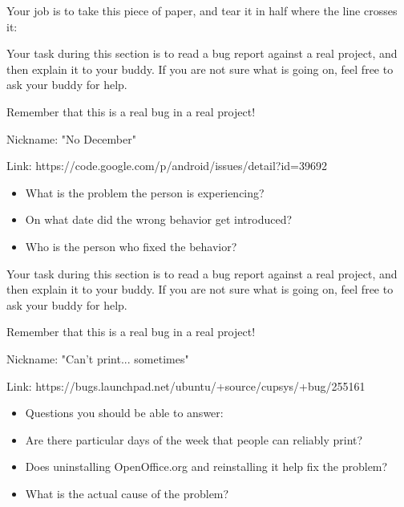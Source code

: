 \documentclass{article}
\begin{document}
Your job is to take this piece of paper, and tear it in half
where the line crosses it:

\hrulefill

Your task during this section is to read a bug report against a real project, and 
then explain it to your buddy. If you are not sure what is going on, feel free to 
ask your buddy for help.

Remember that this is a real bug in a real project!

Nickname: "No December"

Link: https://code.google.com/p/android/issues/detail?id=39692

\begin{itemize}
\item What is the problem the person is experiencing?
\item On what date did the wrong behavior get introduced?
\item Who is the person who fixed the behavior?
\end{itemize}

\hrulefill



Your task during this section is to read a bug report against a real project, and 
then explain it to your buddy. If you are not sure what is going on, feel free to 
ask your buddy for help.

Remember that this is a real bug in a real project!

Nickname: "Can't print... sometimes"

Link: https://bugs.launchpad.net/ubuntu/+source/cupsys/+bug/255161

\begin{itemize}
\item Questions you should be able to answer:
\item Are there particular days of the week that people can reliably print?
\item Does uninstalling OpenOffice.org and reinstalling it help fix the problem?
\item What is the actual cause of the problem?
\end{itemize}
\end{document}
